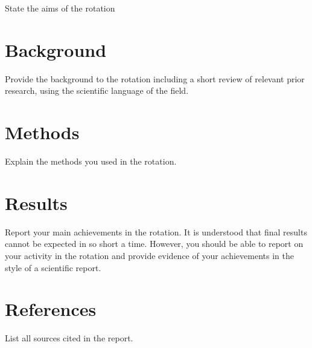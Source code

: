 \documentclass[paper=a4wide, fontsize=12pt]{scrartcl}	 %
\begin{document}
State the aims of the rotation

\section*{Background}

Provide the background to the rotation including a short review of relevant prior research, using the scientific language of the field.

\section*{Methods}

Explain the methods you used in the rotation.


\section*{Results}

Report your main achievements in the rotation. It is understood that final results cannot be expected in so short a time. However, you should be able to report on your activity in the rotation and provide evidence of your achievements in the style of a scientific report.


\section*{References}

List all sources cited in the report.
\end{document}
